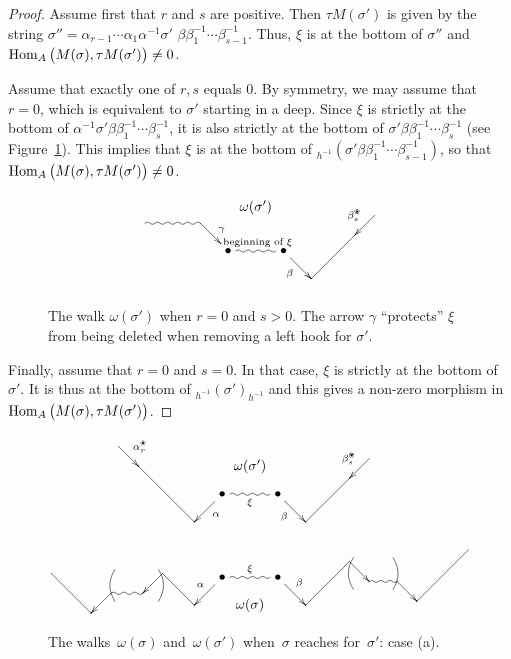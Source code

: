 \documentclass{amsart}
\theoremstyle{definition}
\newcommand{\blossom}{^\text{\ding{96}}} %
\newcommand{\Hom}[1]{\operatorname{{\rm Hom}}_{#1}}
\begin{document}
\begin{proof}
Assume first that $r$ and $s$ are positive.
Then $\tau M(\sigma')$ is given by the string $\sigma''=\alpha_{r-1} \cdots \alpha_1 \alpha^{-1} \sigma'$ $\beta \beta_1^{-1} \cdots \beta_{s-1}^{-1}$.
Thus, $\xi$ is at the bottom of $\sigma''$ and $\Hom{A} \big( M(\sigma), \tau M(\sigma') \big) \neq 0$.

Assume that exactly one of $r,s$ equals $0$.
By symmetry, we may assume that $r=0$, which is equivalent to $\sigma'$ starting in a deep.
Since $\xi$ is strictly at the bottom of $\alpha^{-1}\sigma'\beta\beta_1^{-1}\cdots\beta_s^{-1}$, it is also strictly at the bottom of $\sigma'\beta\beta_1^{-1}\cdots\beta_s^{-1}$ (see Figure~\ref{fig: r=0}).
This implies that $\xi$ is at the bottom of $_{h^{-1}}(\sigma'\beta\beta_1^{-1}\cdots\beta_{s-1}^{-1})$, so that $\Hom{A} \big( M(\sigma), \tau M(\sigma') \big) \ne 0$.

\begin{figure}[h]
 	\capstart
\[
\xy
%
(-33,16)="-14";
(-28,21)="-13";
(-14,21)="-12";
(-7,14)*+{\bullet}="-11";
(0,25)*+{\omega(\sigma')};
(7,14)*+{\bullet}="11";
(14,7)="12";
(25,18)="13";
(30,23)="14";
%
{\ar@{~} "-13";"-12"};
{\ar^{\gamma} "-12";"-11"};
{\ar@{~}^{\text{ beginning of }\xi} "-11";"11"};
{\ar_\beta "11";"12"};
{\ar@{-} "12";"13"};
{\ar_{\beta_s\blossom} "14";"13"};
%
\endxy
\]
    \caption{The walk $\omega(\sigma')$ when $r=0$ and $s>0$. The arrow $\gamma$ ``protects'' $\xi$ from being deleted when removing a left hook for $\sigma'$.}
    \label{fig: r=0}
\end{figure}

Finally, assume that $r=0$ and $s=0$.
In that case, $\xi$ is strictly at the bottom of $\sigma'$.
It is thus at the bottom of $_{h^{-1}}(\sigma')_{h^{-1}}$ and this gives a non-zero morphism in $\Hom{A} \big( M(\sigma), \tau M(\sigma') \big)$.
\end{proof}

\begin{figure}[p]
\[
\xy
%
(-33,26)="-14";
(-28,21)="-13";
(-14,7)="-12";
(-7,14)*+{\bullet}="-11";
(0,21)*+{\omega(\sigma')};
(7,14)*+{\bullet}="11";
(14,7)="12";
(25,18)="13";
(30,23)="14";
%
{\ar^{\alpha_r\blossom} "-14";"-13"};
{\ar@{-} "-13";"-12"};
{\ar^\alpha "-11";"-12"};
{\ar@{~}_\xi "-11";"11"};
{\ar_\beta "11";"12"};
{\ar@{-} "12";"13"};
{\ar_{\beta_s\blossom} "14";"13"};
%
%
(-50,-6)="-7";
(-40,-16)="-6";
(-35,-11)="-5";
(-27,-11)="-4";
(-22,-6)="-3";
(-14,-14)="-2";
(-7,-7)*+{\bullet}="-1";
(0,-14)*+{\omega(\sigma)};
(7,-7)*+{\bullet}="1";
(14,-14)="2";
(25,-3)="3";
(30,-8)="4";
(37,-8)="5";
(42,-13)="6";
(55,0)="7";
%
{\ar@{-} "-7";"-6"};
{\ar "-5";"-6"};
{\ar@{~} "-5";"-4"};
{\ar "-3";"-4"};
{\ar@{-} "-3";"-2"};
{\ar_\alpha "-1";"-2"};
{\ar@{~}^\xi "-1";"1"};
{\ar^\beta "1";"2"};
{\ar@{-} "2";"3"};
{\ar "3";"4"};
{\ar@{~} "4";"5"};
{\ar "5";"6"};
{\ar@{-} "6";"7"};
%
{\ar@/^.3pc/@{-} (-23,-5);(-23,-13)};
{\ar@/_.3pc/@{-} (-34,-5);(-34,-13)};
%
{\ar@/_.3pc/@{-} (26,-2);(26,-10)};
{\ar@/^.3pc/@{-} (36,-2);(36,-10)};
%
\endxy
\]
    \caption{The walks~$\omega(\sigma)$ and~$\omega(\sigma')$ when~$\sigma$ reaches for~$\sigma'$: case (a).}
    \vspace{1cm}
    \label{fig: dance case a}
\end{figure}
\end{document}

